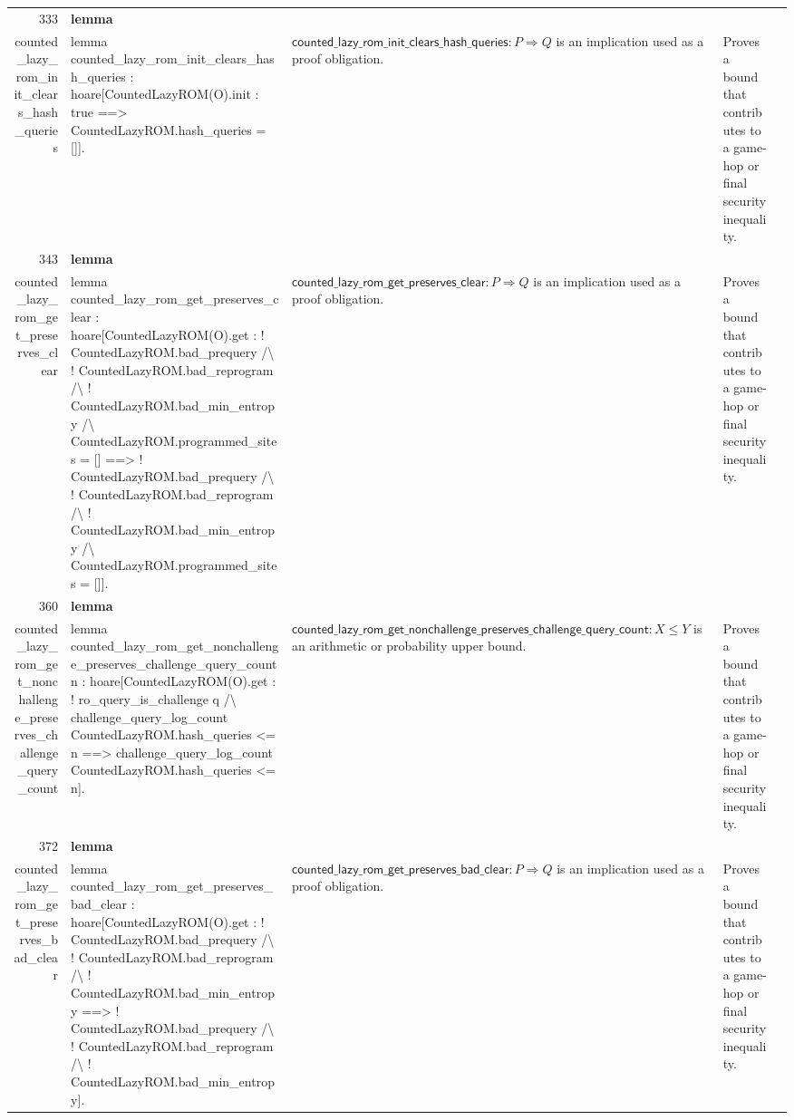 \documentclass[10pt]{article}
\newcommand{\ec}[1]{\begingroup\ttfamily\scriptsize #1\endgroup}
\begin{document}
\begin{longtable}{r L{0.17\textwidth} L{0.26\textwidth} L{0.27\textwidth} L{0.20\textwidth}}
333 & \textbf{lemma}\\\ec{counted\_lazy\_rom\_init\_clears\_hash\_queries} & \ec{lemma counted\_lazy\_rom\_init\_clears\_hash\_queries : hoare[CountedLazyROM(O).init : true ==> CountedLazyROM.hash\_queries = []].} & \(\mathsf{counted\_lazy\_rom\_init\_clears\_hash\_queries} : P \Rightarrow Q\) is an implication used as a proof obligation. & Proves a bound that contributes to a game-hop or final security inequality. \\
343 & \textbf{lemma}\\\ec{counted\_lazy\_rom\_get\_preserves\_clear} & \ec{lemma counted\_lazy\_rom\_get\_preserves\_clear : hoare[CountedLazyROM(O).get : ! CountedLazyROM.bad\_prequery /\textbackslash{} ! CountedLazyROM.bad\_reprogram /\textbackslash{} ! CountedLazyROM.bad\_min\_entropy /\textbackslash{} CountedLazyROM.programmed\_sites = [] ==> ! CountedLazyROM.bad\_prequery /\textbackslash{} ! CountedLazyROM.bad\_reprogram /\textbackslash{} ! CountedLazyROM.bad\_min\_entropy /\textbackslash{} CountedLazyROM.programmed\_sites = []].} & \(\mathsf{counted\_lazy\_rom\_get\_preserves\_clear} : P \Rightarrow Q\) is an implication used as a proof obligation. & Proves a bound that contributes to a game-hop or final security inequality. \\
360 & \textbf{lemma}\\\ec{counted\_lazy\_rom\_get\_nonchallenge\_preserves\_challenge\_query\_count} & \ec{lemma counted\_lazy\_rom\_get\_nonchallenge\_preserves\_challenge\_query\_count n : hoare[CountedLazyROM(O).get : ! ro\_query\_is\_challenge q /\textbackslash{} challenge\_query\_log\_count CountedLazyROM.hash\_queries <= n ==> challenge\_query\_log\_count CountedLazyROM.hash\_queries <= n].} & \(\mathsf{counted\_lazy\_rom\_get\_nonchallenge\_preserves\_challenge\_query\_count} : X \le Y\) is an arithmetic or probability upper bound. & Proves a bound that contributes to a game-hop or final security inequality. \\
372 & \textbf{lemma}\\\ec{counted\_lazy\_rom\_get\_preserves\_bad\_clear} & \ec{lemma counted\_lazy\_rom\_get\_preserves\_bad\_clear : hoare[CountedLazyROM(O).get : ! CountedLazyROM.bad\_prequery /\textbackslash{} ! CountedLazyROM.bad\_reprogram /\textbackslash{} ! CountedLazyROM.bad\_min\_entropy ==> ! CountedLazyROM.bad\_prequery /\textbackslash{} ! CountedLazyROM.bad\_reprogram /\textbackslash{} ! CountedLazyROM.bad\_min\_entropy].} & \(\mathsf{counted\_lazy\_rom\_get\_preserves\_bad\_clear} : P \Rightarrow Q\) is an implication used as a proof obligation. & Proves a bound that contributes to a game-hop or final security inequality. \\

\end{longtable}
\end{document}
